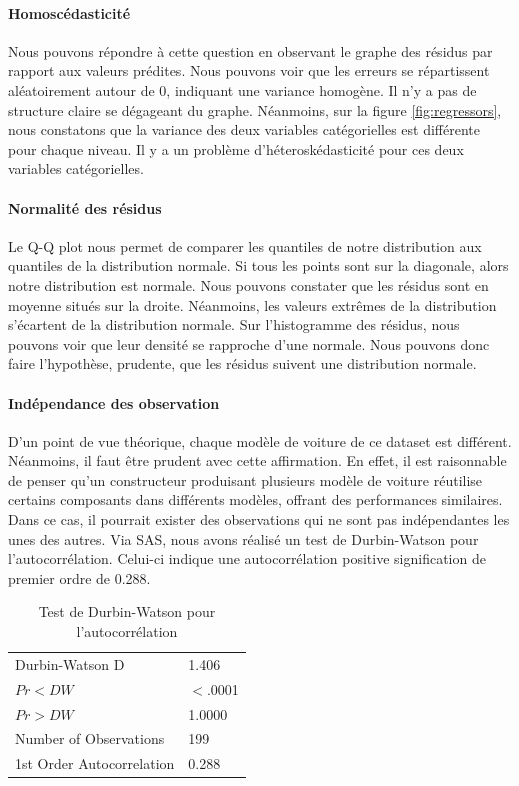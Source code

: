 \documentclass[11pt,a4paper]{article}
\begin{document}
\paragraph{Homoscédasticité} Nous pouvons répondre à cette question en observant le graphe des résidus par rapport aux valeurs prédites. Nous pouvons voir que les erreurs se répartissent aléatoirement autour de 0, indiquant une variance homogène. Il n'y a pas de structure claire se dégageant du graphe.
Néanmoins, sur la figure \ref{fig:regressors}, nous constatons que la variance des deux variables catégorielles est différente pour chaque niveau. Il y a un problème d'héteroskédasticité pour ces deux variables catégorielles.
\paragraph{Normalité des résidus} Le Q-Q plot nous permet de comparer les quantiles de notre distribution aux quantiles de la distribution normale. Si tous les points sont sur la diagonale, alors notre distribution est normale. Nous pouvons constater que les résidus sont en moyenne situés sur la droite. Néanmoins, les valeurs extrêmes de la distribution s'écartent de la distribution normale. Sur l'histogramme des résidus, nous pouvons voir que leur densité se rapproche d'une normale. Nous pouvons donc faire l'hypothèse, prudente, que les résidus suivent une distribution normale.

\paragraph{Indépendance des observation} D'un point de vue théorique, chaque modèle de voiture de ce dataset est différent. Néanmoins, il faut être prudent avec cette affirmation. En effet, il est raisonnable de penser qu'un constructeur produisant plusieurs modèle de voiture réutilise certains composants dans différents modèles, offrant des performances similaires. Dans ce cas, il pourrait exister des observations qui ne sont pas indépendantes les unes des autres. Via SAS, nous avons réalisé un test de Durbin-Watson pour l'autocorrélation. Celui-ci indique une autocorrélation positive signification de premier ordre de 0.288.
\begin{table}
	\scriptsize
	\centering
	\begin{tabulary}{1\textwidth}{LL}
		\hline
		 Durbin-Watson D &    1.406\\
		$Pr < DW$ &    $<$.0001\\
		$Pr > DW $&    1.0000\\
		Number of Observations &    199\\
		1st Order Autocorrelation &    0.288\\\hline
	\end{tabulary}
	\caption{Test de Durbin-Watson pour l'autocorrélation}
	\label{table:}
\end{table}
\end{document}
